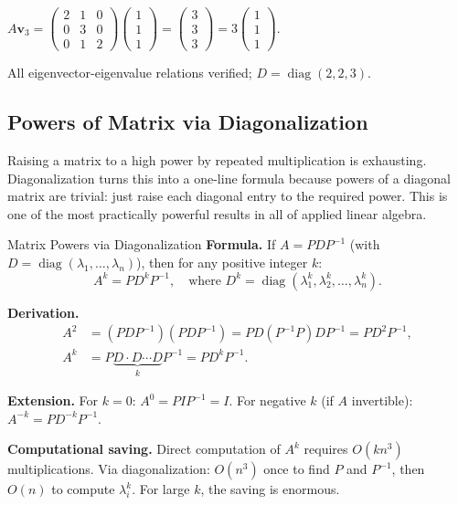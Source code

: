 \documentclass[12pt,a4paper]{article}
\begin{document}
$A\mathbf{v}_3 = \begin{pmatrix}2&1&0\\0&3&0\\0&1&2\end{pmatrix}\begin{pmatrix}1\\1\\1\end{pmatrix} = \begin{pmatrix}3\\3\\3\end{pmatrix} = 3\begin{pmatrix}1\\1\\1\end{pmatrix}$. \checkmark

All eigenvector-eigenvalue relations verified; $D = \operatorname{diag}(2,2,3)$.


\subsection{Powers of Matrix via Diagonalization}

Raising a matrix to a high power by repeated multiplication is exhausting.
Diagonalization turns this into a one-line formula because powers of a diagonal matrix are trivial: just raise each diagonal entry to the required power.
This is one of the most practically powerful results in all of applied linear algebra.

\begin{infobox}{Matrix Powers via Diagonalization}
\textbf{Formula.}
If $A = PDP^{-1}$ (with $D = \operatorname{diag}(\lambda_1,\ldots,\lambda_n)$), then for any positive integer $k$:
\[
  A^{k} = P D^{k} P^{-1}, \quad \text{where } D^{k} = \operatorname{diag}(\lambda_1^k, \lambda_2^k, \ldots, \lambda_n^k).
\]

\textbf{Derivation.}
\begin{align*}
  A^{2} &= (PDP^{-1})(PDP^{-1}) = PD(P^{-1}P)DP^{-1} = PD^{2}P^{-1},\\
  A^{k} &= P\underbrace{D\cdot D\cdots D}_{k}P^{-1} = PD^{k}P^{-1}.
\end{align*}

\textbf{Extension.}
For $k = 0$: $A^0 = PIP^{-1} = I$. For negative $k$ (if $A$ invertible): $A^{-k} = PD^{-k}P^{-1}$.

\textbf{Computational saving.}
Direct computation of $A^{k}$ requires $O(kn^3)$ multiplications.
Via diagonalization: $O(n^3)$ once to find $P$ and $P^{-1}$, then $O(n)$ to compute $\lambda_i^k$. For large $k$, the saving is enormous.
\end{infobox}
\end{document}
